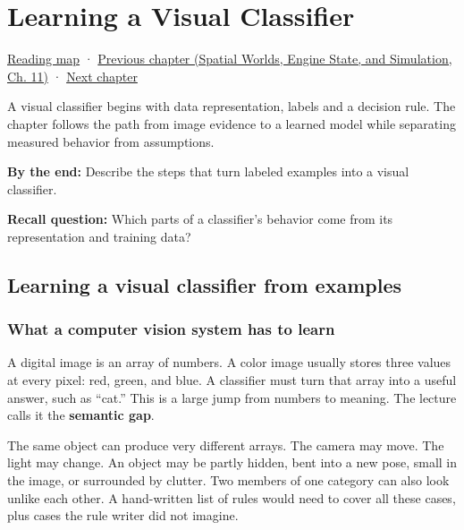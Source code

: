 \chapter{Learning a Visual Classifier}\label{04-visual-computing-ii-ch031-learning-a-visual-classifier}\hypertarget{04-visual-computing-ii-ch031}{}\label{stagechapter:04-visual-computing-ii-ch031}

\hyperref[volume-reading-map]{Reading map} · \href{../05-Spatial-Worlds-Engine-State-and-Simulation/main.pdf\#nameddest=04-visual-computing-ii-ch030-mesh-operators-boundaries-and-diffusion}{Previous chapter (Spatial Worlds, Engine State, and Simulation, Ch. 11)} · \hyperref[04-visual-computing-ii-ch032-pose-estimation-and-robust-fitting]{Next chapter}

A visual classifier begins with data representation, labels and a decision rule. The chapter follows the path from image evidence to a learned model while separating measured behavior from assumptions.

\textbf{By the end:} Describe the steps that turn labeled examples into a visual classifier.

\textbf{Recall question:} Which parts of a classifier's behavior come from its representation and training data?

\section{Learning a visual classifier from examples}\label{04-visual-computing-ii-ch031-learning-a-visual-classifier-from-examples}

\subsection{What a computer vision system has to learn}\label{04-visual-computing-ii-ch031-what-a-computer-vision-system-has-to-learn}

A digital image is an array of numbers. A color image usually stores three values at every pixel: red, green, and blue. A classifier must turn that array into a useful answer, such as ``cat.'' This is a large jump from numbers to meaning. The lecture calls it the \textbf{semantic gap}.

The same object can produce very different arrays. The camera may move. The light may change. An object may be partly hidden, bent into a new pose, small in the image, or surrounded by clutter. Two members of one category can also look unlike each other. A hand-written list of rules would need to cover all these cases, plus cases the rule writer did not imagine.


